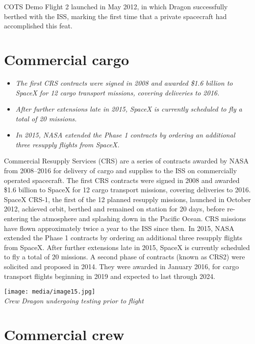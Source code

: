 COTS Demo Flight 2 launched in May 2012, in which Dragon successfully
berthed with the ISS, marking the first time that a private spacecraft
had accomplished this feat.

\section{Commercial cargo}\label{commercial-cargo}

\begin{itemize}
\item
  \emph{The first CRS contracts were signed in 2008 and awarded \$1.6
  billion to SpaceX for 12 cargo transport missions, covering deliveries
  to 2016.}
\item
  \emph{After further extensions late in 2015, SpaceX is currently
  scheduled to fly a total of 20 missions.}
\item
  \emph{In 2015, NASA extended the Phase 1 contracts by ordering an
  additional three resupply flights from SpaceX.}
\end{itemize}

Commercial Resupply Services (CRS) are a series of contracts awarded by
NASA from 2008--2016 for delivery of cargo and supplies to the ISS on
commercially operated spacecraft. The first CRS contracts were signed in
2008 and awarded \$1.6 billion to SpaceX for 12 cargo transport
missions, covering deliveries to 2016. SpaceX CRS-1, the first of the 12
planned resupply missions, launched in October 2012, achieved orbit,
berthed and remained on station for 20 days, before re-entering the
atmosphere and splashing down in the Pacific Ocean. CRS missions have
flown approximately twice a year to the ISS since then. In 2015, NASA
extended the Phase 1 contracts by ordering an additional three resupply
flights from SpaceX. After further extensions late in 2015, SpaceX is
currently scheduled to fly a total of 20 missions. A second phase of
contracts (known as CRS2) were solicited and proposed in 2014. They were
awarded in January 2016, for cargo transport flights beginning in 2019
and expected to last through 2024.

\texttt{[image: media/image15.jpg]}\\
\emph{Crew Dragon undergoing testing prior to flight}

\section{Commercial crew}\label{commercial-crew}

